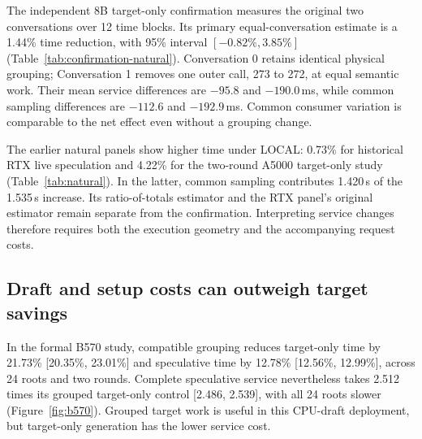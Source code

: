 \begin{samepage}
The independent 8B target-only confirmation measures the original two conversations over 12 time blocks. Its primary equal-conversation estimate is a 1.44\% time reduction, with 95\% interval $[-0.82\%,3.85\%]$ (Table~\ref{tab:confirmation-natural}). Conversation 0 retains identical physical grouping; Conversation 1 removes one outer call, 273 to 272, at equal semantic work. Their mean service differences are $-95.8$ and $-190.0$\,ms, while common sampling differences are $-112.6$ and $-192.9$\,ms. Common consumer variation is comparable to the net effect even without a grouping change.\par
\end{samepage}


The earlier natural panels show higher time under LOCAL: 0.73\% for historical RTX live speculation and 4.22\% for the two-round A5000 target-only study (Table~\ref{tab:natural}). In the latter, common sampling contributes 1.420\,s of the 1.535\,s increase. Its ratio-of-totals estimator and the RTX panel's original estimator remain separate from the confirmation. Interpreting service changes therefore requires both the execution geometry and the accompanying request costs.

\FloatBarrier
\subsection{Draft and setup costs can outweigh target savings}
\label{sec:cost}
In the formal B570 study, compatible grouping reduces target-only time by 21.73\% [20.35\%, 23.01\%] and speculative time by 12.78\% [12.56\%, 12.99\%], across 24 roots and two rounds. Complete speculative service nevertheless takes 2.512 times its grouped target-only control [2.486, 2.539], with all 24 roots slower (Figure~\ref{fig:b570}). Grouped target work is useful in this CPU-draft deployment, but target-only generation has the lower service cost.

